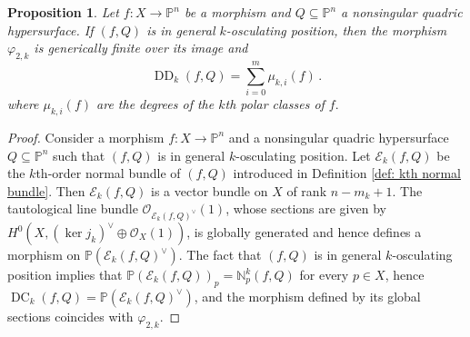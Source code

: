 \documentclass[11pt,reqno]{amsart}
\numberwithin{equation}{section}
\theoremstyle{plain}
\numberwithin{theorem}{section}
\newtheorem{proposition}[theorem]{Proposition}
\theoremstyle{definition}
\newcommand{\N}{\mathbb{N}}
\renewcommand{\P}{\mathbb{P}}
\newcommand{\EE}{\mathcal{E}}
\newcommand{\OO}{\mathcal{O}}
\newcommand{\DC}{\operatorname{DC}}
\newcommand{\DD}{\operatorname{DD}}
\begin{document}
\begin{proposition}\label{prop: kth order ED degree sum of kth order polar degrees}
Let $f\colon X \to \P^n$ be a morphism and $Q\subseteq\P^n$ a nonsingular quadric hypersurface. If $(f,Q)$ is in general $k$-osculating position, then the morphism $\varphi_{2,k}$ is generically finite over its image and
\begin{equation}\label{eq: kth order ED degree sum of kth order polar degrees}
\DD_k(f,Q) = \sum_{i=0}^m \mu_{k,i}(f)\,.
\end{equation}
where $\mu_{k,i}(f)$ are the degrees of the $k$th polar classes of $f.$
\end{proposition}
\begin{proof}
Consider a morphism $f\colon X\to\P^n$ and a nonsingular quadric hypersurface $Q\subseteq\P^n$ such that $(f,Q)$ is in general $k$-osculating position.
Let $\EE_k(f,Q)$ be the $k$th-order normal bundle of $(f,Q)$ introduced in Definition \ref{def: kth normal bundle}. Then $\EE_k(f,Q)$ is a vector bundle on $X$ of rank $n-m_k+1$. The tautological line bundle $\OO_{\EE_k(f,Q)^\vee}(1)$, whose sections are given by $H^0(X,(\ker j_k)^\vee\oplus \OO_X(1))$, is globally generated and hence defines a morphism on $\P(\EE_k(f,Q)^\vee).$ The fact that $(f,Q)$ is in general $k$-osculating position implies that $\P(\EE_k(f,Q))_p = \N_p^k(f,Q)$ for every $p\in X$, hence $\DC_k(f,Q)=\P(\EE_k(f,Q)^\vee)$, and the morphism defined by its global sections coincides with $\varphi_{2,k}.$


\end{proof}
\end{document}
